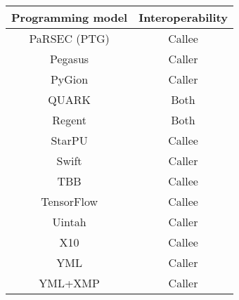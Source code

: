 \begin{tabular}{cc}
\hline
Programming model & Interoperability \\
\hline
PaRSEC (PTG) & Callee\\
Pegasus & Caller\\
PyGion & Caller\\
QUARK & Both\\
Regent & Both\\
StarPU & Callee\\
Swift & Caller\\
TBB & Callee\\
TensorFlow & Callee\\
Uintah & Caller\\
X10 & Callee\\
YML & Caller\\
YML+XMP & Caller\\
\hline
\end{tabular}
